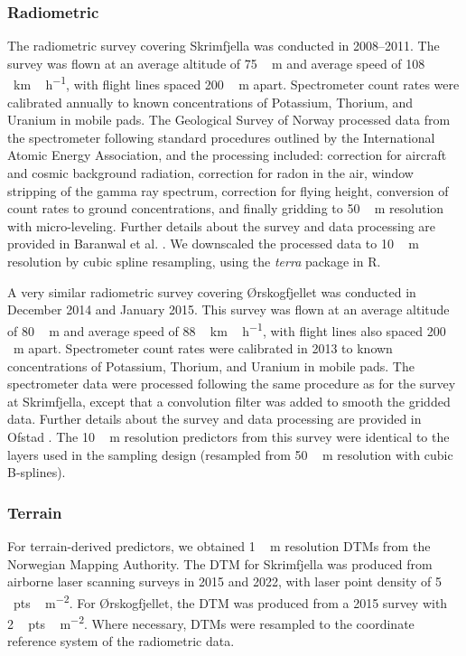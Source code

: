 \documentclass[soil, manuscript]{copernicus}
\begin{document}
\subsubsection{Radiometric}

The radiometric survey covering Skrimfjella was conducted in 2008--2011.
The survey was flown at an average altitude of \unit{75\,m} and average speed of \unit{108\,km\,h^{-1}}, with flight lines spaced \unit{200\,m} apart.
Spectrometer count rates were calibrated annually to known concentrations of Potassium, Thorium, and Uranium in mobile pads.
The Geological Survey of Norway processed data from the spectrometer following standard procedures outlined by the International Atomic Energy Association, and the processing included: correction for aircraft and cosmic background radiation, correction for radon in the air, window stripping of the gamma ray spectrum, correction for flying height, conversion of count rates to ground concentrations, and finally gridding to \unit{50\,m} resolution with micro-leveling.
Further details about the survey and data processing are provided in Baranwal et al. \citeyearpar{baranwalHelicopterborneMagneticElectromagnetic2013}.
We downscaled the processed data to \unit{10\,m} resolution by cubic spline resampling, using the \emph{terra} package in R.

A very similar radiometric survey covering Ørskogfjellet was conducted in December 2014 and January 2015.
This survey was flown at an average altitude of \unit{80\,m} and average speed of \unit{88\,km\,h^{-1}}, with flight lines also spaced \unit{200\,m} apart.
Spectrometer count rates were calibrated in 2013 to known concentrations of Potassium, Thorium, and Uranium in mobile pads.
The spectrometer data were processed following the same procedure as for the survey at Skrimfjella, except that a convolution filter was added to smooth the gridded data.
Further details about the survey and data processing are provided in Ofstad \citeyearpar{ofstadHelicopterborneMagneticRadiometric2015}.
The \unit{10\,m} resolution predictors from this survey were identical to the layers used in the sampling design (resampled from \unit{50\,m} resolution with cubic B-splines).

\subsubsection{Terrain}

For terrain-derived predictors, we obtained \unit{1\,m} resolution DTMs from the Norwegian Mapping Authority.
The DTM for Skrimfjella was produced from airborne laser scanning surveys in 2015 and 2022, with laser point density of \unit{5\,pts\,m^{-2}}.
For Ørskogfjellet, the DTM was produced from a 2015 survey with \unit{2\,pts\,m^{-2}}.
Where necessary, DTMs were resampled to the coordinate reference system of the radiometric data.
\end{document}
